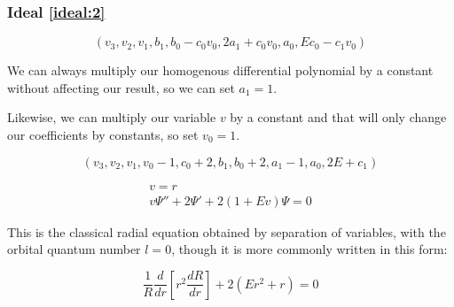 \documentclass{beamer}
\begin{document}
\begin{frame}
\frametitle{Ideal \eqref{ideal:2}}
\[ \left(v_{3}, v_{2}, v_{1}, b_{1}, b_{0} - c_{0} v_{0}, 2 a_{1} + c_{0} v_{0}, a_{0}, E c_{0} - c_{1} v_{0}\right) \]


We can always multiply our homogenous differential polynomial by a constant without affecting our result, so we can set $a_1=1$.

Likewise, we can multiply our variable $v$ by a constant and that will only change our coefficients by constants,
so set $v_0=1$.

\begin{equation*}
\left(v_{3}, v_{2}, v_{1}, v_{0} - 1, c_{0} + 2, b_{1}, b_{0} + 2, a_{1} - 1, a_{0}, 2 E + c_{1}\right)
\end{equation*}

\begin{equation*}
\label{classical eq in ideal}
\begin{gathered}
v=r \\
v \Psi'' + 2 \Psi' + 2(1 + E v) \Psi = 0
\end{gathered}
\end{equation*}

This is the classical radial equation obtained by separation of variables,
with the orbital quantum number $l=0$,
though it is more commonly written in this form:

\begin{equation*}
\frac{1}{R} \frac{d}{dr}\left[ r^2 \frac{dR}{dr}\right] + 2(Er^2 + r) = 0
\end{equation*}
\end{frame}
\end{document}
